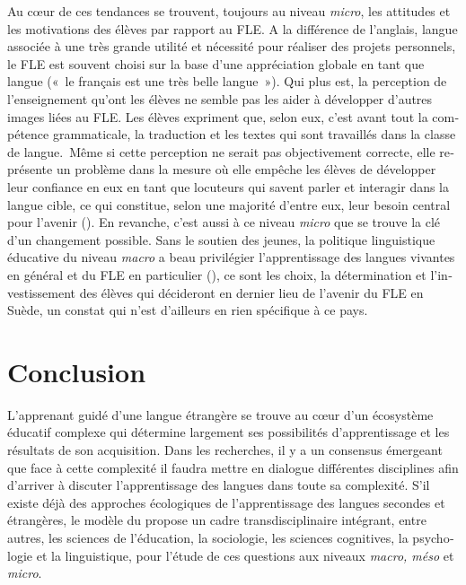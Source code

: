 \documentclass[french, output=paper]{langscibook}
\begin{document}
\begin{otherlanguage}{french}
Au cœur de ces tendances se trouvent, toujours au niveau \textit{micro}, les attitudes et les motivations des élèves par rapport au FLE. A la différence de l’anglais, langue associée à une très grande utilité et nécessité pour réaliser des projets personnels, le FLE est souvent choisi sur la base d’une appréciation globale en tant que langue («~le français est une très belle langue~»). Qui plus est, la perception de l’enseignement qu’ont les élèves ne semble pas les aider à développer d’autres images liées au FLE. Les élèves expriment que, selon eux, c’est avant tout la compétence grammaticale, la traduction et les textes qui sont travaillés dans la classe de langue.~Même si cette perception ne serait pas objectivement correcte, elle représente un problème dans la mesure où elle empêche les élèves de développer leur confiance en eux en tant que locuteurs qui savent parler et interagir dans la langue cible, ce qui constitue, selon une majorité d’entre eux, leur besoin central pour l’avenir (\citealt{BusseWilliams2010, Oakes2013}). En revanche, c’est aussi à ce niveau \textit{micro} que se trouve la clé d’un changement possible. Sans le soutien des jeunes, la politique linguistique éducative du niveau \textit{macro} a beau privilégier l’apprentissage des langues vivantes en général et du FLE en particulier (\citealt{Mitchell2009}), ce sont les choix, la détermination et l’investissement des élèves qui décideront en dernier lieu de l’avenir du FLE en Suède, un constat qui n’est d’ailleurs en rien spécifique à ce pays.

\section{Conclusion}\label{sec:granfeldt:7}

L’apprenant guidé d’une langue étrangère se trouve au cœur d’un écosystème éducatif complexe qui détermine largement ses possibilités d’apprentissage et les résultats de son acquisition. Dans les recherches, il y a un consensus émergeant que face à cette complexité il faudra mettre en dialogue différentes disciplines afin d’arriver à discuter l’apprentissage des langues dans toute sa complexité. S’il existe déjà des approches écologiques de l’apprentissage des langues secondes et étrangères, le modèle du \citet{TheDouglasFirgroup2016} propose un cadre transdisciplinaire intégrant, entre autres, les sciences de l’éducation, la sociologie, les sciences cognitives, la psychologie et la linguistique, pour l’étude de ces questions aux niveaux \textit{macro, méso} et \textit{micro}.


\end{otherlanguage}
\end{document}
